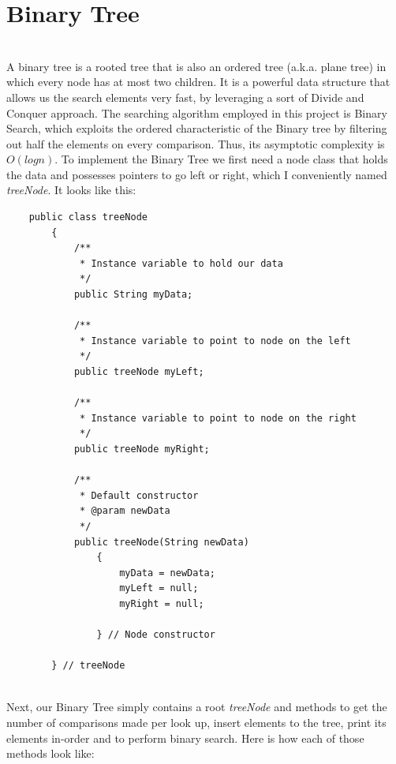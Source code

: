 \documentclass[letterpaper, 10pt]{article}
\begin{document}
\section{Binary Tree}
\\
A binary tree is a rooted tree that is also an ordered tree (a.k.a. plane tree) in which every node has at most two children. It is a powerful data structure that allows us the search elements very fast, by leveraging a sort of Divide and Conquer approach. The searching algorithm employed in this project is Binary Search, which exploits the ordered characteristic of the Binary tree by filtering out half the elements on every comparison. Thus, its asymptotic complexity is $O(log n)$. To implement the Binary Tree we first need a node class that holds the data and possesses pointers to go left or right, which I conveniently named \textit{treeNode}. It looks like this:
\\
\begin{lstlisting}
    public class treeNode
		{
			/**
			 * Instance variable to hold our data
			 */
			public String myData;
			
			/**
			 * Instance variable to point to node on the left
			 */
			public treeNode myLeft;
			
			/**
			 * Instance variable to point to node on the right
			 */
			public treeNode myRight;
			
			/**
			 * Default constructor
			 * @param newData
			 */
			public treeNode(String newData)
				{
					myData = newData;
					myLeft = null;
					myRight = null;
					
				} // Node constructor
			
		} // treeNode
\end{lstlisting}
\\
Next, our Binary Tree simply contains a root \textit{treeNode} and methods to get the number of comparisons made per look up, insert elements to the tree, print its elements in-order and to perform binary search. Here is how each of those methods look like:
\\
\end{document}
